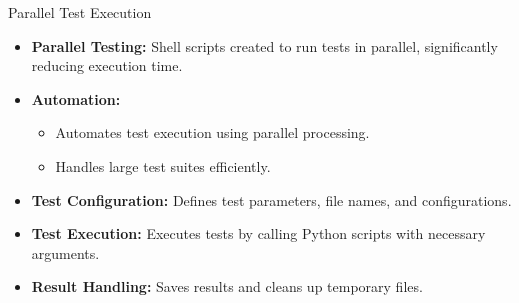 \documentclass[aspectratio=169,xcolor=dvipsnames, t]{beamer}
\begin{document}
\begin{frame}{Parallel Test Execution}
    \begin{itemize}
            \item \textbf{Parallel Testing:} Shell scripts created to run tests in parallel, significantly reducing execution time.
            \item \textbf{Automation:} 
                \begin{itemize}
                    \item Automates test execution using parallel processing.
                    \item Handles large test suites efficiently.
                \end{itemize}
            \item \textbf{Test Configuration:} Defines test parameters, file names, and configurations.
            \item \textbf{Test Execution:} Executes tests by calling Python scripts with necessary arguments.
            \item \textbf{Result Handling:} Saves results and cleans up temporary files.
        \end{itemize}
\end{frame}



\end{document}
